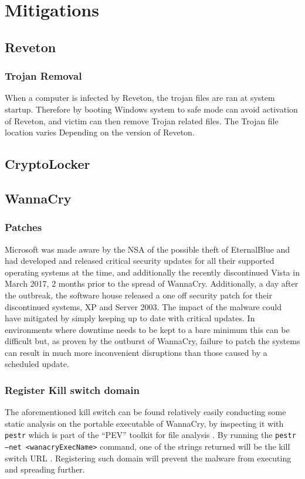 \documentclass[10pt,a4paper]{article}
\begin{document}
\section{Mitigations} \label{sec:mitigations}

\subsection{Reveton}

\subsubsection{Trojan Removal}
When a computer is infected by Reveton, the trojan files are ran at system startup. Therefore by booting Windows system to safe mode can avoid activation of Reveton, and victim can then remove Trojan related files\cite{revetonremoval}. The Trojan file location varies Depending on the version of Reveton.

\subsection{CryptoLocker}

\subsection{WannaCry}

\subsubsection{Patches}
Microsoft was made aware by the NSA of the possible theft of EternalBlue and had developed and released critical security updates for all their supported operating systems at the time, and additionally the recently discontinued Vista in March 2017, 2 months prior to the spread of WannaCry.
Additionally, a day after the outbreak, the software house released a one off security patch for their discontinued systems, XP and Server 2003.
The impact of the malware could have mitigated by simply keeping up to date with critical updates. In environments where downtime needs to be kept to a bare minimum this can be difficult but, as proven by the outburst of WannaCry, failure to patch the systems can result in much more inconvenient disruptions than those caused by a scheduled update.

\subsubsection{Register Kill switch domain}
The aforementioned kill switch can be found relatively easily conducting some static analysis on the portable executable of WannaCry, by inspecting it with \texttt{pestr} which is part of the ``PEV'' toolkit for file analysis \cite{PEtoolkit}. By running the \texttt{pestr --net <wanacryExecName>} command, one of the strings returned will be the kill switch URL \cite{pestrVideo}. Registering such domain will prevent the malware from executing and spreading further.
\end{document}
